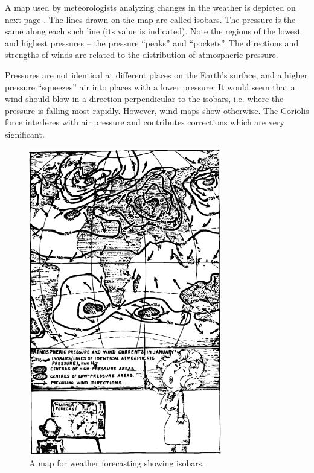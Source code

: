 A map used by meteorologists analyzing changes in the weather is depicted on next page . The lines drawn
on the map are called isobars. The pressure is the same along each such line (its value is indicated). Note the regions of the lowest and highest pressures -- the pressure ``peaks'' and ``pockets''. The directions and strengths of winds are related to the distribution of atmospheric pressure. 

Pressures are not identical at different places on the Earth's surface, and a higher pressure ``squeezes'' air into places with a lower pressure. It would seem that a wind should blow in a direction perpendicular to the isobars, i.e. where the pressure is falling most rapidly. However, wind maps show otherwise. The Coriolis force interferes with air pressure and contributes corrections which are
very significant.


\begin{figure}[!ht]
\centering
\includegraphics[width=0.75\textwidth]{figures/fig-7-6.pdf}
\caption{A map for weather forecasting showing isobars.}
\label{fig-7-6}
\end{figure}


